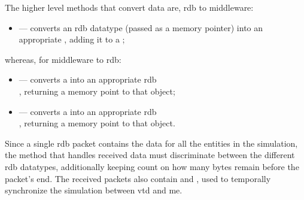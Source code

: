 The higher level methods that convert data are, \gls{rdb} to \gls{middleware}:

\begin{itemize}
	\item {} --- converts an \gls{rdb} datatype (passed as a memory pointer) into an appropriate , adding it to a ;
\end{itemize}

\FLOATnoindent whereas, for \gls{middleware} to \gls{rdb}:

\begin{itemize}
	\item {} --- converts a  into an appropriate \gls{rdb} \\ , returning a memory point to that object;
	\item {} --- converts a  into an appropriate \gls{rdb} \\ , returning a memory point to that object.
\end{itemize}

Since a single \gls{rdb} \gls{packet} contains the data for all the entities in the simulation, the method that handles received data must discriminate between the different \gls{rdb} datatypes, additionally keeping count on how many bytes remain before the \gls{packet}'s end. The received \glspl{packet} also contain  and , used to temporally synchronize the simulation between \gls{vtd} and \gls{me}.

